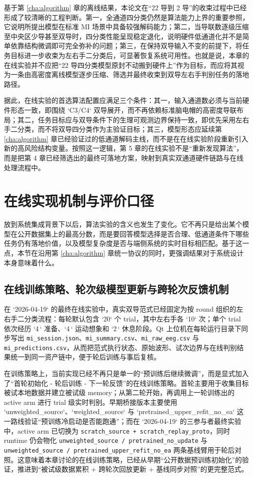 基于第 \ref{cha:algorithm} 章的离线结果，本论文在“22 导到 2 导”的收束过程中已经形成了较清晰的工程判断。第一，全通道四分类仍然是算法能力上界的重要参照，它说明所提出模型在标准 MI 场景中具备较强解码能力；第二，当导联数逐级压缩至中央区少导甚至双导时，四分类性能呈现稳定退化，说明硬件低通道化并不是简单依靠结构微调即可完全弥补的问题；第三，在保持双导输入不变的前提下，将任务目标进一步收束为左右手二分类后，可显著恢复系统可用性。也就是说，本章的在线实验并不应把“22 导四分类模型原封不动搬到硬件上”作为目标，而应将其视为一条由高密度离线模型逐步压缩、筛选并最终收束到双导左右手判别任务的落地路径。

据此，在线实验的首选算法配置应满足三个条件：其一，输入通道数必须与当前硬件形态一致，即围绕 `C3/C4` 双导展开，而不再依赖标准脑电帽的高密度导联布局；其二，任务目标应与双导条件下的生理可观测边界保持一致，即优先采用左右手二分类，而不将双导四分类作为主验证目标；其三，模型形态应延续第 \ref{cha:algorithm} 章已经验证过的低通道解码主线，而不是在在线实验阶段重新引入新的高风险结构变量。按照这一逻辑，第 5 章的在线实验不是“重新发现算法”，而是把第 4 章已经筛选出的最终可落地方案，映射到真实双通道硬件链路与在线处理流程中。

\section{在线实现机制与评价口径}

放到系统集成背景下以后，算法实验的含义也发生了变化。它不再只是给出某个模型在公开数据集上的最高分数，而是要回答模型选择是否合理、低通道条件下哪些任务仍有落地价值，以及模型复杂度是否与端侧系统的实时目标相匹配。基于这一点，本节在沿用第 \ref{cha:algorithm} 章统一协议的同时，更强调结果对于系统设计本身意味着什么。

\subsection{在线训练策略、轮次级模型更新与跨轮次反馈机制}

在 `2026-04-19` 的最终在线实验中，真实双导范式已经固定为按 round 组织的左右手二分类流程：每轮默认包含 `20` 个 trial，其中左右手各 `10` 次；单个 trial 依次经历 `4\,` 准备、`4\,` 运动想象和 `2\,` 休息阶段。Qt 上位机在每轮运行目录下同步写出 \texttt{mi\_session.json}、\texttt{mi\_summary.csv}、\texttt{mi\_raw\_eeg.csv} 与 \texttt{mi\_predictions.csv}，从而把范式执行状态、原始波形、试次边界与在线判别结果统一到同一资产链中，便于轮后训练与事后复核。

在训练策略上，当前实现已经不再只是单一的“预训练后继续微调”，而是显式加入了“首轮初始化 - 轮后训练 - 下一轮反馈”的在线训练策略。首轮主要用于收集目标被试本地数据并建立被试级 memory；从第二轮开始，再调用上一轮训练出的 active arm 进行 trial 级实时判别。早期桥接版本主要使用 `unweighted\_source`、`weighted\_source` 与 `pretrained\_upper\_refit\_no\_ea` 这一路线验证“预训练冷启动是否能跑通”；而在 `2026-04-19` 的三参与者最终实验中，active arm 已切换为 \texttt{scratch\_source + scratch\_replay\_proto}，同时 runtime 仍会物化 \texttt{unweighted\_source / pretrained\_no\_update} 与 \texttt{unweighted\_source / pretrained\_upper\_refit\_no\_ea} 两条基线臂用于轮后对照。这意味着本章讨论的在线训练策略，已经从早期“公开数据预训练初始化”的验证，推进到“被试级数据累积 + 跨轮次回放更新 + 基线同步对照”的更完整范式。

